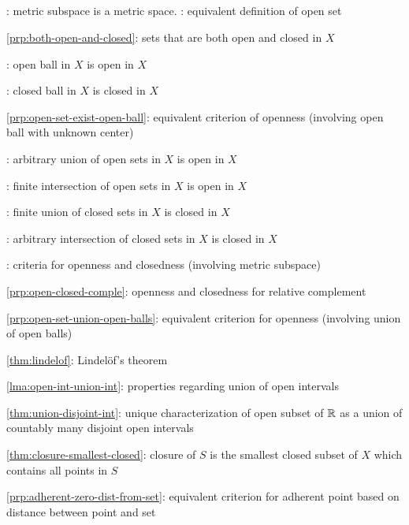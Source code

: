 \subsection*{}
\item {}: metric subspace is a metric space.
: equivalent definition of open set
\item \cref{prp:both-open-and-closed}: sets that are both open and closed in \(X\)
\item {}: open ball in \(X\) is open in \(X\)
\item {}: closed ball in \(X\) is closed in \(X\)
\item \cref{prp:open-set-exist-open-ball}: equivalent criterion of openness (involving open ball with unknown center)
\item {}: arbitrary union of open sets in \(X\) is open in \(X\)
\item {}: finite intersection of open sets in \(X\) is open in \(X\)
\item {}: finite union of closed sets in \(X\) is closed in \(X\)
\item {}: arbitrary intersection of closed sets in \(X\) is closed in \(X\)
\item {}: criteria for
openness and closedness (involving metric subspace)
\item \cref{prp:open-closed-comple}: openness and closedness for relative complement
\item \cref{prp:open-set-union-open-balls}: equivalent criterion for openness (involving union of open balls)
\item \cref{thm:lindelof}: Lindel\"of's theorem
\item \cref{lma:open-int-union-int}: properties regarding union of open intervals
\item \cref{thm:union-disjoint-int}: unique characterization of open subset of
\(\mathbb{R}\) as a union of countably many disjoint open intervals
\item \cref{thm:closure-smallest-closed}: closure of \(S\) is the smallest closed subset of \(X\) which contains all points in \(S\)
\item \cref{prp:adherent-zero-dist-from-set}: equivalent criterion for adherent point based on distance between point and set
